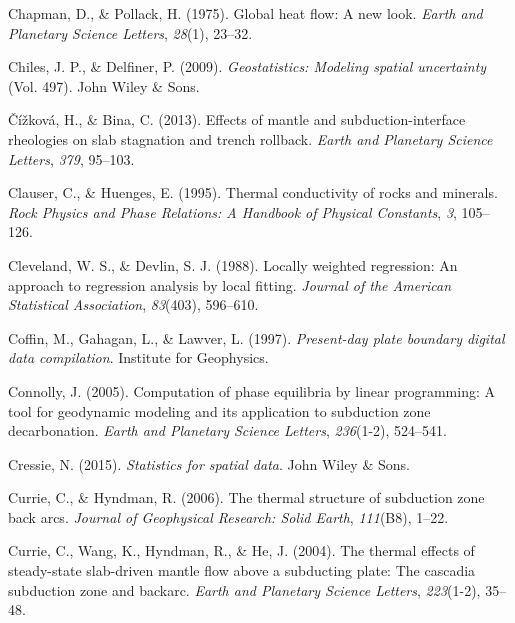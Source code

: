\begin{CSLReferences}{1}{1}
\leavevmode{}%
Chapman, D., \& Pollack, H. (1975). Global heat flow: A new look. \emph{Earth and Planetary Science Letters}, \emph{28}(1), 23--32.

\leavevmode{}%
Chiles, J. P., \& Delfiner, P. (2009). \emph{Geostatistics: Modeling spatial uncertainty} (Vol. 497). John Wiley \& Sons.

\leavevmode{}%
Čížková, H., \& Bina, C. (2013). Effects of mantle and subduction-interface rheologies on slab stagnation and trench rollback. \emph{Earth and Planetary Science Letters}, \emph{379}, 95--103.

\leavevmode{}%
Clauser, C., \& Huenges, E. (1995). Thermal conductivity of rocks and minerals. \emph{Rock Physics and Phase Relations: A Handbook of Physical Constants}, \emph{3}, 105--126.

\leavevmode{}%
Cleveland, W. S., \& Devlin, S. J. (1988). Locally weighted regression: An approach to regression analysis by local fitting. \emph{Journal of the American Statistical Association}, \emph{83}(403), 596--610.

\leavevmode{}%
Coffin, M., Gahagan, L., \& Lawver, L. (1997). \emph{Present-day plate boundary digital data compilation}. Institute for Geophysics.

\leavevmode{}%
Connolly, J. (2005). Computation of phase equilibria by linear programming: A tool for geodynamic modeling and its application to subduction zone decarbonation. \emph{Earth and Planetary Science Letters}, \emph{236}(1-2), 524--541.

\leavevmode{}%
Cressie, N. (2015). \emph{Statistics for spatial data}. John Wiley \& Sons.

\leavevmode{}%
Currie, C., \& Hyndman, R. (2006). The thermal structure of subduction zone back arcs. \emph{Journal of Geophysical Research: Solid Earth}, \emph{111}(B8), 1--22.

\leavevmode{}%
Currie, C., Wang, K., Hyndman, R., \& He, J. (2004). The thermal effects of steady-state slab-driven mantle flow above a subducting plate: The cascadia subduction zone and backarc. \emph{Earth and Planetary Science Letters}, \emph{223}(1-2), 35--48.


\end{CSLReferences}
